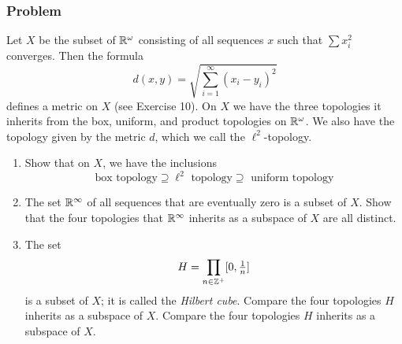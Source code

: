 \subsubsection{Problem}
Let $X$ be the subset of $\mathbb R^\omega$ consisting of all sequences $x$ such that $\sum x_i^2$ converges. Then the formula
\[d(x,y) = \sqrt{\sum_{i=1}^\infty (x_i - y_i)^2}\]
defines a metric on $X$ (see Exercise 10). On $X$ we have the three topologies it inherits from the box, uniform, and product topologies on $\mathbb R^\omega$. We also have the topology given by the metric $d$, which we call the $\ell^2$-topology.
\begin{enumerate}
\item Show that on $X$, we have the inclusions
\[\textrm{box topology} \supseteq \ell^2 \textrm { topology} \supseteq \textrm{ uniform topology}\]
\item The set $\mathbb R^\infty$ of all sequences that are eventually zero is a subset of $X$. Show that the four topologies that $\mathbb R^\infty$ inherits as a subspace of $X$ are all distinct.
\item The set
\[H = \prod_{n \in \mathbb Z^+} [0, \tfrac1n]\]
is a subset of $X$; it is called the \emph{Hilbert cube}. Compare the four topologies $H$ inherits as a subspace of $X$. Compare the four topologies $H$ inherits as a subspace of $X$.
\end{enumerate}

